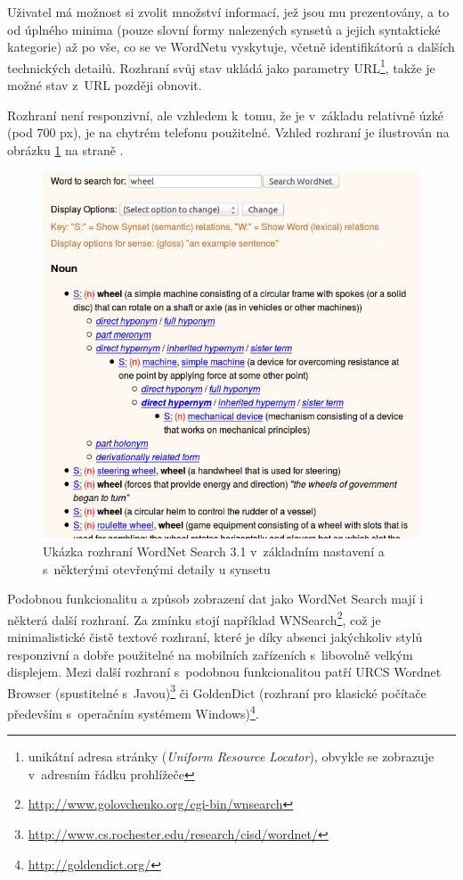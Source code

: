 \documentclass[a4paper,11pt,openany,twoside]{book}
\begin{document}
					Uživatel má možnost si zvolit množství informací, jež jsou mu prezentovány, a to od úplného minima (pouze slovní formy nalezených synsetů a jejich syntaktické kategorie) až po vše, co se ve WordNetu vyskytuje, včetně identifikátorů a dalších technických detailů. Rozhraní svůj stav ukládá jako parametry URL\footnote{unikátní adresa stránky (\textit{Uniform Resource Locator}), obvykle se zobrazuje v~adresním řádku prohlížeče}, takže je možné stav z~URL později obnovit.

					Rozhraní není responzivní, ale vzhledem k~tomu, že je v~základu relativně úzké (pod 700 px), je na chytrém telefonu použitelné. Vzhled rozhraní je ilustrován na obrázku \ref{fig:wnsearch} na straně \pageref{fig:wnsearch}.

					\begin{figure}[h]
						\centering
						\includegraphics[width=1.0\textwidth]{wnsearch.png}
						\caption{Ukázka rozhraní WordNet Search 3.1 v~základním nastavení a s~některými otevřenými detaily u synsetu}
						\label{fig:wnsearch}
					\end{figure}

					Podobnou funkcionalitu a způsob zobrazení dat jako WordNet Search mají i některá další rozhraní. Za zmínku stojí například WNSearch\footnote{\url{http://www.golovchenko.org/cgi-bin/wnsearch}}, což je minimalistické čistě textové rozhraní, které je díky absenci jakýchkoliv stylů responzivní a dobře použitelné na mobilních zařízeních s~libovolně velkým displejem. Mezi další rozhraní s~podobnou funkcionalitou patří URCS Wordnet Browser (spustitelné s~Javou)\footnote{\url{http://www.cs.rochester.edu/research/cisd/wordnet/}} či GoldenDict (rozhraní pro klasické počítače především s~operačním systémem Windows)\footnote{\url{http://goldendict.org/}}.
\end{document}
